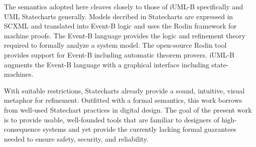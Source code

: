 The semantics adopted here cleaves closely to those of iUML-B
specifically and UML Statecharts\cite{Alexandre} generally. Models
decribed in Statecharts are expressed in SCXML and translated into
Event-B logic and uses the Rodin framework\cite{Abrial} for machine
proofs.
%
The Event-B language
\cite{abrial10:_model_event_b} provides the logic and refinement
theory required to formally analyze a system model.  The open-source
Rodin tool \cite{abrial10:_rodin} provides support for Event-B
including automatic theorem provers.  iUML-B \cite{snook14:_b_statem}
augments the Event-B language with a graphical interface including
state-machines.

With suitable restrictions, Statecharts already provide a sound,
intuitive, visual metaphor for refinement. Outfitted with a formal
semantics, this work borrows from well-used Statechart practices in
digital design.  The goal of the present work is to provide usable,
well-founded tools that are familiar to designers of high-consequence
systems and yet provide the currently lacking formal guarantees needed
to ensure safety, security, and reliability.
